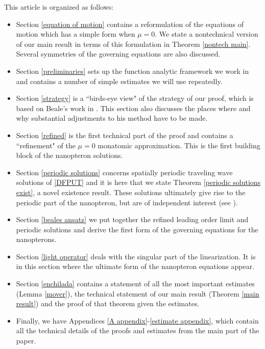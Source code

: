 \documentclass[12pt]{amsart}
\numberwithin{equation}{section}
\begin{document}
This article is organized as follows:
\begin{itemize}
\item Section \ref{equation of motion} contains a reformulation of the equations
of motion which 
 has a simple form when $\mu = 0$. We state a nontechnical version of our  main result in terms of
 this formulation in Theorem \ref{nontech main}.
Several symmetries of the governing equations are also discussed.
\item Section \ref{preliminaries} sets up the function analytic framework we work in and contains 
a number of simple estimates we will use repeatedly.
\item Section \ref{strategy} is a ``birds-eye view" of the strategy of our proof, which is based on 
Beale's work in \cite{beale2}. This section
also discusses the places where and why substantial adjustments to his method have to be made.
\item Section \ref{refined} is the first technical part of the proof and contains a ``refinement" of the $\mu =0$ monatomic
approximation. This is the first building block of the nanopteron solutions.
\item Section \ref{periodic solutions}  concerns spatially periodic traveling wave solutions of \eqref{DFPUT}
and it is here that we state
Theorem \ref{periodic solutions exist}, a novel existence result. These
solutions ultimately give rise to the periodic part of the nanopteron, but are of independent interest (see \cite{qin} \cite{betti-pelinovsky}).
\item Section \ref{beales ansatz} we put together the refined leading order limit and periodic solutions
and derive the first form of the governing equations for the nanopterons.
\item Section \ref{light operator} deals with  the singular part of the linearization. It is in this section where the ultimate form of the nanopteron equations appear.
\item Section \ref{enchilada} contains a statement of all the most important estimates (Lemma \ref{mover}), the
 technical statement of our main result (Theorem \ref{main result}) and the proof of that theorem given the estimates.
 \item Finally, we have Appendices \ref{A appendix}-\ref{estimate appendix}, which contain all the technical details
 of the proofs and estimates from the main part of the paper.
\end{itemize}
\end{document}

